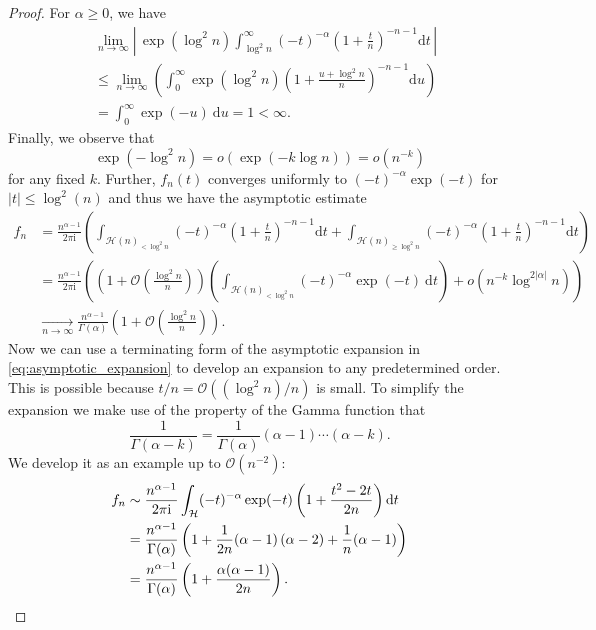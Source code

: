 \begin{proof}
  For $\alpha \geq 0$, we have 
  \begin{align*}
    &\lim_{n \to \infty} \left|\, \exp(\log^2 n) \int_{\log^2 n}^\infty (-t)^{-\alpha} \left(1 + \frac{t}{n}\right)^{-n-1} \mathrm{d}t\, \right| \\
    &\leq \lim_{n \to \infty} \left(\int_{0}^\infty \exp(\log^2 n) \left(1 + \frac{u + \log^2 n}{n}\right)^{-n-1} \mathrm{d}u\right)
    \\
    &= \int_{0}^\infty \exp(-u)~\mathrm{d}u
    = 1 < \infty.
  \end{align*}
  Finally, we observe that
  $$
    \exp\left(-\log^2 n\right) = o(\exp( - k \log n)) = o\left(n^{-k}\right)
  $$
  for any fixed $k$. Further, $f_n(t)$ converges uniformly to $(-t)^{-\alpha}\exp(-t)$ for $|t| \leq \log^2(n)$ and thus we have the asymptotic estimate
  \begin{align*}
    f_{n} 
    &= \frac{n^{\alpha-1}}{2\pi \mathrm{i}}
    \left(
      \int_{\mathcal{H}(n)_{< \log^2 n}} (-t)^{-\alpha}\left(1 + \frac{t}{n}\right)^{-n-1}\mathrm{d}t +
      \int_{\mathcal{H}(n)_{\geq \log^2 n}} (-t)^{-\alpha}\left(1 + \frac{t}{n}\right)^{-n-1} \mathrm{d}t
    \right) \\
    &= \frac{n^{\alpha-1}}{2\pi \mathrm{i}}
    \left(
      \left(
        1 + \mathcal{O}\left(\frac{\log^2 n}{n}\right)
      \right)
      \left(
        \int_{\mathcal{H}(n)_{< \log^2 n}} (-t)^{-\alpha}\exp(-t)~\mathrm{d}t
      \right) +
      o\left(n^{-k} \log^{2|\alpha|} n \right)
    \right) \\
    &\xrightarrow[n \to \infty]{} \frac{n^{\alpha-1}}{\Gamma(\alpha)}\left(1 + \mathcal{O}\left(\frac{\log^2 n}{n}\right)\right).
  \end{align*}
  Now we can use a terminating form of the asymptotic expansion in \eqref{eq:asymptotic_expansion} to develop an expansion to any predetermined order. This is possible because $t/n = \mathcal{O}((\log^2 n) /n)$ is small.
  To simplify the expansion we make use of the property of the Gamma function that 
  $$
    \frac{1}{\Gamma(\alpha - k)} = \frac{1}{\Gamma(\alpha)}(\alpha - 1)\cdots(\alpha - k).
  $$
  We develop it as an example up to $\mathcal{O}\left(n^{-2}\right)$:
  \begin{align*}
    f_{n} &\sim \frac{n^{\alpha-1}}{2\pi \mathrm{i}}\int_\mathcal{H} (-t)^{-\alpha}\exp(-t)\left(1+\frac{t^{2}-2t}{2n}\right)\mathrm{d}t\\
    &= \frac{n^{\alpha-1}}{\Gamma(\alpha)}\left(1 + \frac{1}{2n}(\alpha - 1)\left(\alpha -2\right) + \frac{1}{n}(\alpha - 1)\right)\\
    &= \frac{n^{\alpha-1}}{\Gamma(\alpha)}\left(1 + \frac{\alpha(\alpha-1)}{2n}\right). \qedhere
  \end{align*}
\end{proof}

